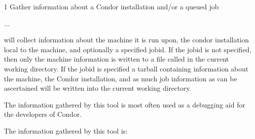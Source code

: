 \begin{ManPage}{\label{man-condor-gather-info}}{1}
{Gather information about a Condor installation and/or a queued job}
\Synopsis

...


\Description
{} will collect information about the machine it is run
upon, the condor installation local to the machine, and optionally a specified
jobid. If the jobid is not specified, then only the machine information is
written to a file called  in the current working
directory. If the jobid is specified a tarball containing information about
the machine, the Condor installation, and as much job information as can be 
ascertained will be written into the current working directory.

The information gathered by this tool is most often used as a debugging aid
for the developers of Condor.

\begin{Options}
\end{Options}

\GenRem

The information gathered by this tool is:


\end{ManPage}

